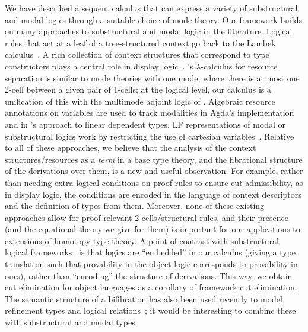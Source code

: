 \documentclass[a4paper,USenglish]{lipics-v2016}
\newcommand\citep[1]{\cite{#1}}
\newcommand\citet[1]{\cite{#1}}
\begin{document}
We have described a sequent calculus that can express a variety of
substructural and modal logics through a suitable choice of mode theory.
Our framework builds on many approaches to substructural and modal logic
in the literature.  Logical rules that act at a leaf of a
tree-structured context go back to the Lambek
calculus~\citep{lambek58calculus}.  A rich collection of context
structures that correspond to type constructors plays a central role in
display logic~\citep{belnap82display}.  \citet{atkey04separation}'s
$\lambda$-calculus for resource separation is similar to mode theories
with one mode, where there is at most one 2-cell between a given pair of
1-cells; at the logical level, our calculus is a unification of this
with the multimode adjoint logic of \citet{reed09adjoint}.  Algebraic
resource annotations on variables are used to track modalities in Agda's
implementation~\citep{abel15modal} and in \citet{mcbride16nuttin}'s
approach to linear dependent types.  LF representations of modal or
substructural logics work by restricting the use of cartesian
variables~\citep{crary10substructural}.  Relative to all of these
approaches, we believe that the analysis of the context
structures/resources as a \emph{term} in a base type theory, and the
fibrational structure of the derivations over them, is a new and useful
observation.  For example, rather than needing extra-logical conditions
on proof rules to ensure cut admissibility, as in display logic, the
conditions are encoded in the language of context descriptors and the
definition of types from them.  Moreover, none of these existing
approaches allow for proof-relevant 2-cells/structural rules, and their
presence (and the equational theory we give for them) is important for
our applications to extensions of homotopy type theory.  A point of
contrast with substructural logical
frameworks~\citep{cervesatopfenning02llf,watkins+03clf-tr,reed09thesis}
is that logics are ``embedded'' in our calculus (giving a type
translation such that provability in the object logic corresponds to
provability in ours), rather than ``encoding'' the structure of
derivations.  This way, we obtain cut elimination for object languages
as a corollary of framework cut elimination.  The semantic structure of
a bifibration has also been used recently to model refinement types and
logical
relations~\citep{zeilberger14functors,zeilbergermelies17presheaf,johannXXbifibrational};
it would be interesting to combine these with substructural and modal
types.
\end{document}
